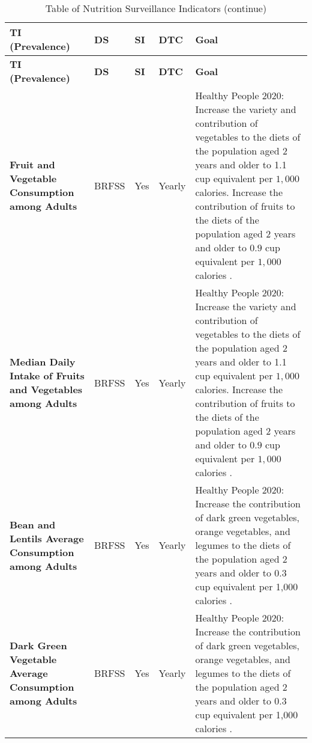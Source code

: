 \documentclass[12pt,letterpaper]{report}
\begin{document}
\begin{landscape}
\begin{longtable}{|>{\raggedright\arraybackslash}p{}|>{\raggedright\arraybackslash}p{}|
>{\raggedright\arraybackslash}p{}|
>{\raggedright\arraybackslash}p{}|
>{\raggedright\arraybackslash}p{}|}
\caption{Table of Nutrition Surveillance Indicators}
\hline
\textbf{TI (Prevalence)} & \textbf{DS} & \textbf{SI} & \textbf{DTC} & \textbf{Goal} \\ 
\hline
\endfirsthead
\caption[]{Table of Nutrition Surveillance Indicators (continue)}
\hline
\textbf{TI (Prevalence)} & \textbf{DS} & \textbf{SI} & \textbf{DTC} & \textbf{Goal} \\ 
\hline 
\endhead %
\textbf{Fruit and Vegetable Consumption among Adults}
& BRFSS
& Yes
& Yearly
& Healthy People 2020: Increase the variety and contribution of vegetables to the diets of the population aged $2$ years and older to 1.1 cup equivalent per $1,000$ calories. Increase the contribution of fruits to the diets of the population aged $2$ years and older to $0.9$ cup equivalent per $1,000$ calories \cite{Healthynutritionweight}. \\ 
\hline
\textbf{Median Daily Intake of Fruits and Vegetables among Adults}
& BRFSS
& Yes
& Yearly
& Healthy People 2020: Increase the variety and contribution of vegetables to the diets of the population aged $2$ years and older to 1.1 cup equivalent per $1,000$ calories. Increase the contribution of fruits to the diets of the population aged $2$ years and older to $0.9$ cup equivalent per $1,000$ calories \cite{Healthynutritionweight}.\\ 
\hline

\textbf{Bean and Lentils Average Consumption among Adults}
& BRFSS
& Yes
& Yearly
& Healthy People 2020: Increase the contribution of dark green vegetables, orange vegetables, and legumes to the diets of the population aged 2 years and older to 0.3 cup equivalent per 1,000 calories \cite{Healthynutritionweight}. \\ 
\hline

\textbf{Dark Green Vegetable Average Consumption among Adults}
& BRFSS
& Yes
& Yearly
& Healthy People 2020: Increase the contribution of dark green vegetables, orange vegetables, and legumes to the diets of the population aged 2 years and older to 0.3 cup equivalent per 1,000 calories \cite{Healthynutritionweight}. \\
\hline


\end{longtable}
\end{landscape}
\end{document}
